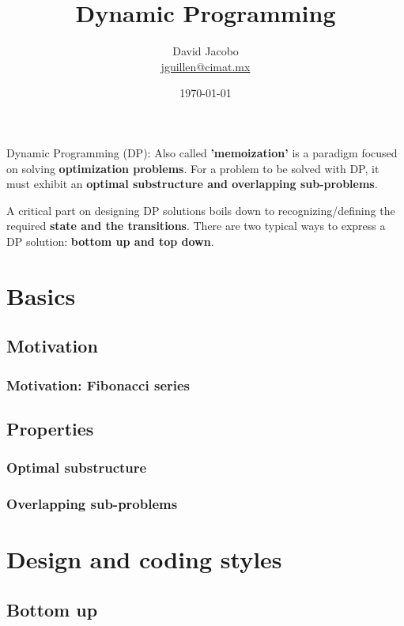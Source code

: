 \documentclass[article]{beamer}
\title{Dynamic Programming}
\author{David Jacobo \\ \href{mailto:jguillen@cimat.mx}{jguillen@cimat.mx}}
\date{\scriptsize{\today}}
\begin{document}
\maketitle

\begin{frame}
\begin{block}{Dynamic Programming (DP):}
	Also called \textbf{'memoization'} is a paradigm focused on solving \textbf{optimization 
	problems}. For a problem to be solved with DP, it must exhibit an \textbf{optimal substructure and
	overlapping sub-problems}.
	
	\vspace{12mm}
	
	A critical part on designing DP solutions boils down to recognizing/defining the 
	required \textbf{state and the transitions}. There are two typical ways to express a DP solution: \textbf{bottom up and top down}.
\end{block}
\end{frame}


\section{Basics}

\subsection{Motivation}
\begin{frame}
	\frametitle{Motivation: Fibonacci series}
\end{frame}

\subsection{Properties}
\begin{frame}
	\frametitle{Optimal substructure}
\end{frame}

\begin{frame}
	\frametitle{Overlapping sub-problems}
\end{frame}

\section{Design and coding styles}

\subsection{Bottom up}
\end{document}
